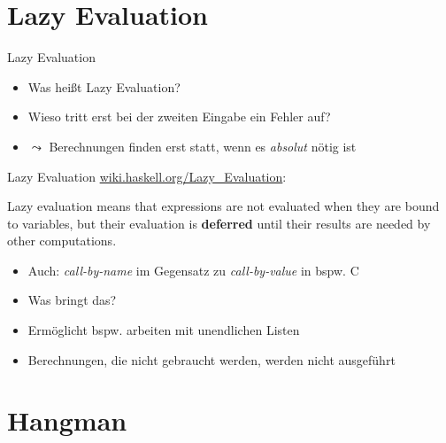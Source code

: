 \documentclass{beamer}
\begin{document}
\section{Lazy Evaluation}

\begin{frame}{Lazy Evaluation}

	\begin{itemize}
		\item Was heißt Lazy Evaluation?
		\item Wieso tritt erst bei der zweiten Eingabe ein Fehler auf?
		\pause
		\item $\leadsto$ Berechnungen finden erst statt, wenn es \emph{absolut} nötig ist
	\end{itemize}
\end{frame}

\begin{frame}{Lazy Evaluation}
      \href{https://wiki.haskell.org/Lazy\_evaluation}{wiki.haskell.org/Lazy\_Evaluation}:

	\begin{displayquote}
		Lazy evaluation means that expressions are not evaluated when they are bound to variables, but their evaluation is \textbf{deferred} until their results are needed by other computations.
	\end{displayquote}

	\begin{itemize}
		\item Auch: \emph{call-by-name} im Gegensatz zu \emph{call-by-value} in bspw. C
		\item Was bringt das?
		\pause
		\item Ermöglicht bspw. arbeiten mit unendlichen Listen
		\item Berechnungen, die nicht gebraucht werden, werden nicht ausgeführt
	\end{itemize}
\end{frame}

\section{Hangman}
\end{document}

